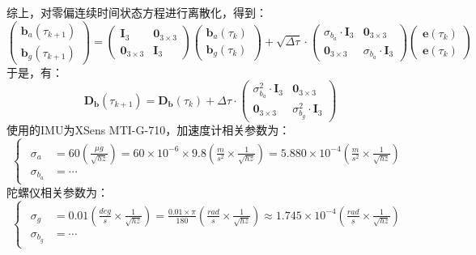 \documentclass[12pt, onecolumn]{article}
\begin{document}
	综上，对零偏连续时间状态方程进行离散化，得到：
	\begin{equation}
	\begin{pmatrix}
	{\boldsymbol{b}}_a(\tau_{k+1})\\{\boldsymbol{b}}_g(\tau_{k+1})
	\end{pmatrix}=\begin{pmatrix}
	\boldsymbol{I}_3&\boldsymbol{0}_{3\times 3}\\
	\boldsymbol{0}_{3\times 3}&\boldsymbol{I}_3
	\end{pmatrix}\begin{pmatrix}
	{\boldsymbol{b}}_a(\tau_{k})\\{\boldsymbol{b}}_g(\tau_{k})
	\end{pmatrix}+\sqrt{\Delta \tau}\cdot\begin{pmatrix}
	\sigma_{b_a}\cdot\boldsymbol{I}_3&\boldsymbol{0}_{3\times 3}\\
	\boldsymbol{0}_{3\times 3}&\sigma_{b_a}\cdot\boldsymbol{I}_3
	\end{pmatrix}\begin{pmatrix}
	\boldsymbol{e}(\tau_k)\\\boldsymbol{e}(\tau_k)
	\end{pmatrix}
	\end{equation}
	于是，有：
	\begin{equation}
	\boldsymbol{D}_{\boldsymbol{b}}(\tau_{k+1})=\boldsymbol{D}_{\boldsymbol{b}}(\tau_{k})+\Delta\tau\cdot\begin{pmatrix}
	\sigma_{b_a}^2\cdot\boldsymbol{I}_3&\boldsymbol{0}_{3\times 3}\\
	\boldsymbol{0}_{3\times 3}&\sigma_{b_g}^2\cdot\boldsymbol{I}_3
	\end{pmatrix}
	\end{equation}
	使用的IMU为XSens MTI-G-710，加速度计相关参数为：
	\begin{equation}
	\begin{cases}
	\begin{aligned}
	\sigma_a&=60\left( \frac{\mu g}{\sqrt{hz}}\right) =60\times 10^{-6}\times 9.8\left( \frac{m}{s^2}\times\frac{1}{\sqrt{hz}}\right) =5.880\times 10^{-4}\left( \frac{m}{s^2}\times\frac{1}{\sqrt{hz}}\right) 
	\\
	\sigma_{b_a}&=\cdots
	\end{aligned}
	\end{cases}
	\end{equation}
	陀螺仪相关参数为：
	\begin{equation}
	\begin{cases}
	\begin{aligned}
	\sigma_g&=0.01\left( \frac{deg}{s}\times\frac{1}{\sqrt{hz}}\right) =\frac{0.01\times \pi}{180}\left( \frac{rad}{s}\times\frac{1}{\sqrt{hz}}\right) 
	\approx 1.745\times 10^{-4}\left( \frac{rad}{s}\times\frac{1}{\sqrt{hz}}\right)
	\\
	\sigma_{b_g}&=\cdots
	\end{aligned}
	\end{cases}
	\end{equation}
	
\end{document}
